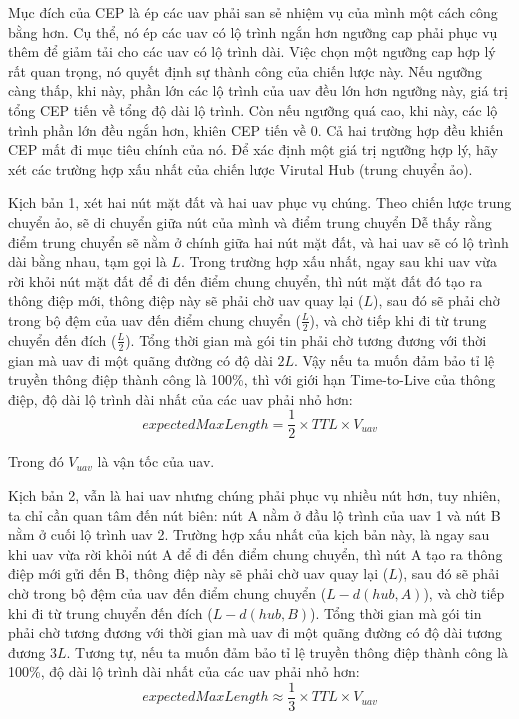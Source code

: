 \documentclass[a4paper]{article}
\begin{document}
Mục đích của CEP là ép các uav phải san sẻ nhiệm vụ của mình một cách công bằng hơn. Cụ thể, nó ép các uav có lộ trình ngắn hơn ngưỡng cap phải phục vụ thêm để giảm tải cho các uav có lộ trình dài.
Việc chọn một ngưỡng cap hợp lý rất quan trọng, nó quyết định sự thành công của chiến lược này. Nếu ngưỡng càng thấp, khi này, phần lớn các lộ trình của uav đều lớn hơn ngưỡng này, giá trị tổng CEP tiến về tổng độ dài lộ trình. Còn nếu ngưỡng quá cao, khi này, các lộ trình phần lớn đều ngắn hơn, khiên CEP tiến về 0. Cả hai trường hợp đều khiến CEP mất đi mục tiêu chính của nó.
Để xác định một giá trị ngưỡng hợp lý, hãy xét các trường hợp xấu nhất của chiến lược Virutal Hub (trung chuyển ảo).

Kịch bản 1, xét hai nút mặt đất và hai uav phục vụ chúng. Theo chiến lược trung chuyển ảo, sẽ di chuyển giữa nút của mình và điểm trung chuyển Dễ thấy rằng điểm trung chuyển sẽ nằm ở chính giữa hai nút mặt đất, và hai uav sẽ có lộ trình dài bằng nhau, tạm gọi là $L$. Trong trường hợp xấu nhất, ngay sau khi uav vừa rời khỏi nút mặt đất để đi đến điểm chung chuyển, thì nút mặt đất đó tạo ra thông điệp mới, thông điệp này sẽ phải chờ uav quay lại ($L$), sau đó sẽ phải chờ trong bộ đệm của uav đến điểm chung chuyển ($\frac L2$), và chờ tiếp khi đi từ trung chuyển đến đích ($\frac L2$). Tổng thời gian mà gói tin phải chờ tương đương với thời gian mà uav đi một quãng đường có độ dài $2L$. Vậy nếu ta muốn đảm bảo tỉ lệ truyền thông điệp thành công là 100\%, thì với giới hạn Time-to-Live của thông điệp, độ dài lộ trình dài nhất của các uav phải nhỏ hơn: 
\begin{equation}
expectedMaxLength = \frac 1 2 \times TTL \times V_{uav}
\end{equation}

Trong đó $V_{uav}$ là vận tốc của uav.

Kịch bản 2, vẫn là hai uav nhưng chúng phải phục vụ nhiều nút hơn, tuy nhiên, ta chỉ cần quan tâm đến nút biên: nút A nằm ở đầu lộ trình của uav 1 và nút B nằm ở cuối lộ trình uav 2.
Trường hợp xấu nhất của kịch bản này, là ngay sau khi uav vừa rời khỏi nút A để đi đến điểm chung chuyển, thì nút A tạo ra thông điệp mới gửi đến B, thông điệp này sẽ phải chờ uav quay lại ($L$), sau đó sẽ phải chờ trong bộ đệm của uav đến điểm chung chuyển ($L - d(hub,A)$), và chờ tiếp khi đi từ trung chuyển đến đích ($L-d(hub,B)$). Tổng thời gian mà gói tin phải chờ tương đương với thời gian mà uav đi một quãng đường có độ dài tương đương $3L$. Tương tự, nếu ta muốn đảm bảo tỉ lệ truyền thông điệp thành công là 100\%, độ dài lộ trình dài nhất của các uav phải nhỏ hơn: 
\begin{equation}
expectedMaxLength \approx \frac 1 3 \times TTL \times V_{uav}
\end{equation}
\end{document}

